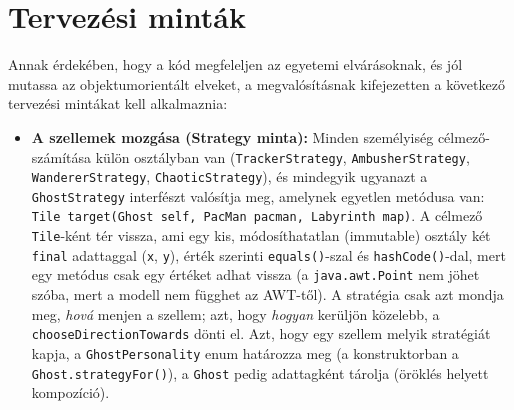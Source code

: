 \documentclass[11pt, a4paper]{article}
\begin{document}
\clearpage

\section{Tervezési minták}
\label{sec:design_patterns}
Annak érdekében, hogy a kód megfeleljen az egyetemi elvárásoknak, és jól mutassa az objektumorientált elveket, a megvalósításnak kifejezetten a következő tervezési mintákat kell alkalmaznia:

\begin{itemize}
    \item \textbf{A szellemek mozgása (Strategy minta):} Minden személyiség célmező-számítása külön osztályban van (\texttt{TrackerStrategy}, \texttt{AmbusherStrategy}, \texttt{WandererStrategy}, \texttt{ChaoticStrategy}), és mindegyik ugyanazt a \texttt{GhostStrategy} interfészt valósítja meg, amelynek egyetlen metódusa van: \texttt{Tile target(Ghost self, PacMan pacman, Labyrinth map)}. A célmező \texttt{Tile}-ként tér vissza, ami egy kis, módosíthatatlan (immutable) osztály két \texttt{final} adattaggal (\texttt{x}, \texttt{y}), érték szerinti \texttt{equals()}-szal és \texttt{hashCode()}-dal, mert egy metódus csak egy értéket adhat vissza (a \texttt{java.awt.Point} nem jöhet szóba, mert a modell nem függhet az AWT-től). A stratégia csak azt mondja meg, \textit{hová} menjen a szellem; azt, hogy \textit{hogyan} kerüljön közelebb, a \texttt{chooseDirectionTowards} dönti el. Azt, hogy egy szellem melyik stratégiát kapja, a \texttt{GhostPersonality} enum határozza meg (a konstruktorban a \texttt{Ghost.strategyFor()}), a \texttt{Ghost} pedig adattagként tárolja (öröklés helyett kompozíció).


\end{itemize}
\end{document}
